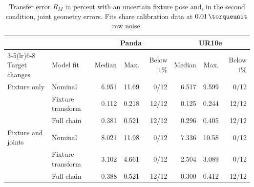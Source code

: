 
\begin{table}[!htbp]
\centering
\small
\setlength{\tabcolsep}{4pt}
\caption{Transfer error \(R_M\) in percent with an uncertain fixture pose and, in the second condition, joint geometry errors. Fits share calibration data at \(0.01\,\torqueunit\) raw noise.}
\label{tab:fixture-baseline}
\begin{tabular}{llrrrrrr}
\toprule
& & \multicolumn{3}{c}{Panda} & \multicolumn{3}{c}{UR10e}\\
\cmidrule(lr){3-5}\cmidrule(lr){6-8}
Target changes & Model fit & Median & Max. & Below \(1\%\) & Median & Max. & Below \(1\%\)\\
\midrule
Fixture only & Nominal & 6.951 & 11.69 & 0/12 & 6.517 & 9.599 & 0/12\\
 & Fixture transform & 0.112 & 0.218 & 12/12 & 0.125 & 0.244 & 12/12\\
 & Full chain & 0.381 & 0.521 & 12/12 & 0.296 & 0.405 & 12/12\\
\addlinespace
Fixture and joints & Nominal & 8.021 & 11.98 & 0/12 & 7.336 & 10.58 & 0/12\\
 & Fixture transform & 3.102 & 4.661 & 0/12 & 2.504 & 3.089 & 0/12\\
 & Full chain & 0.388 & 0.521 & 12/12 & 0.300 & 0.412 & 12/12\\
\bottomrule
\end{tabular}
\end{table}
